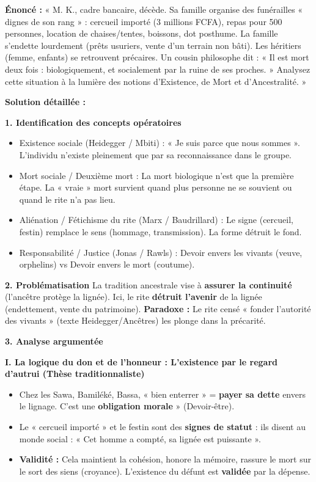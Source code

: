\documentclass[11pt]{article}
\newcommand{\cle}[1]{{\popxbold\color{popdark}#1}}
\begin{document}
\begin{exoresolu}
\textbf{Énoncé :} « M. K., cadre bancaire, décède. Sa famille organise des funérailles « dignes de son rang » : cercueil importé (3 millions FCFA), repas pour 500 personnes, location de chaises/tentes, boissons, dot posthume. La famille s'endette lourdement (prêts usuriers, vente d'un terrain non bâti). Les héritiers (femme, enfants) se retrouvent précaires. Un cousin philosophe dit : « Il est mort deux fois : biologiquement, et socialement par la ruine de ses proches. » Analysez cette situation à la lumière des notions d'Existence, de Mort et d'Ancestralité. »

\tcblower

\textbf{Solution détaillée :}

\textbf{1. Identification des concepts opératoires}
\begin{itemize}
    \item \cle{Existence sociale} (Heidegger / Mbiti) : « Je suis parce que nous sommes ». L'individu n'existe pleinement que par sa reconnaissance dans le groupe.
    \item \cle{Mort sociale / Deuxième mort} : La mort biologique n'est que la première étape. La « vraie » mort survient quand plus personne ne se souvient ou quand le rite n'a pas lieu.
    \item \cle{Aliénation / Fétichisme du rite} (Marx / Baudrillard) : Le signe (cercueil, festin) remplace le sens (hommage, transmission). La forme détruit le fond.
    \item \cle{Responsabilité / Justice} (Jonas / Rawls) : Devoir envers les vivants (veuve, orphelins) vs Devoir envers le mort (coutume).
\end{itemize}

\textbf{2. Problématisation}
La tradition ancestrale vise à \textbf{assurer la continuité} (l'ancêtre protège la lignée). Ici, le rite \textbf{détruit l'avenir} de la lignée (endettement, vente du patrimoine). \textbf{Paradoxe :} Le rite censé « fonder l'autorité des vivants » (texte Heidegger/Ancêtres) les plonge dans la précarité.

\textbf{3. Analyse argumentée}

\textbf{I. La logique du don et de l'honneur : L'existence par le regard d'autrui (Thèse traditionnaliste)}
\begin{itemize}
    \item Chez les Sawa, Bamiléké, Bassa, « bien enterrer » = \textbf{payer sa dette} envers le lignage. C'est une \textbf{obligation morale} » (Devoir-être).
    \item Le « cercueil importé » et le festin sont des \textbf{signes de statut} : ils disent au monde social : « Cet homme a compté, sa lignée est puissante ».
    \item \textbf{Validité :} Cela maintient la cohésion, honore la mémoire, rassure le mort sur le sort des siens (croyance). L'existence du défunt est \textbf{validée} par la dépense.
\end{itemize}


\end{exoresolu}
\end{document}
